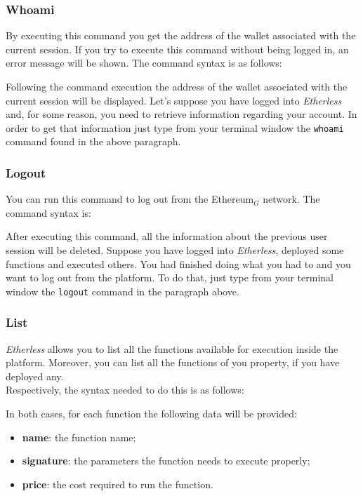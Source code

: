 \subsubsection{Whoami}
By executing this command you get the address of the wallet associated with the current session. If you try to execute this command without being logged in, an error message will be shown. The command syntax is as follows: 
\begin{center}
\end{center}
Following the command execution the address of the wallet associated with the current session will be displayed.
Let's suppose you have logged into \textit{Etherless} and, for some reason, you need to retrieve information regarding your account. In order to get that information just type from your terminal window the \texttt{whoami} command found in the above paragraph.

\subsubsection{Logout}
You can run this command to log out from the Ethereum$_{G}$ network. The command syntax is:
\begin{center}
\end{center}
After executing this command, all the information about the previous user session will be deleted.
Suppose you have logged into \textit{Etherless}, deployed some functions and executed others. You had finished doing what you had to and you want to log out from the platform. To do that, just type from your terminal window the \texttt{logout} command in the paragraph above.

\subsubsection{List}\label{list}
\textit{Etherless} allows you to list all the functions available for execution inside the platform. Moreover, you can list all the functions of you property, if you have deployed any. \\
Respectively, the syntax needed to do this is as follows:
\begin{center}
\end{center}
\noindent In both cases, for each function the following data will be provided:
\begin{itemize}
	\item \textbf{name}: the function name;
	\item \textbf{signature}: the parameters the function needs to execute properly;
	\item \textbf{price}: the cost required to run the function.
\end{itemize}

